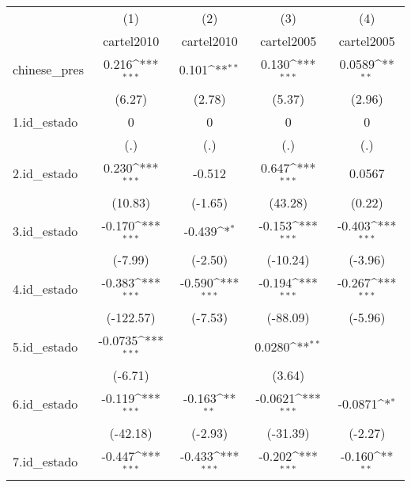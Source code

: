 {
\def\sym#1{\ifmmode^{#1}\else\(^{#1}\)\fi}
\begin{tabular}{l*{4}{c}}
\hline\hline
            &\multicolumn{1}{c}{(1)}&\multicolumn{1}{c}{(2)}&\multicolumn{1}{c}{(3)}&\multicolumn{1}{c}{(4)}\\
            &\multicolumn{1}{c}{cartel2010}&\multicolumn{1}{c}{cartel2010}&\multicolumn{1}{c}{cartel2005}&\multicolumn{1}{c}{cartel2005}\\
\hline
chinese\_pres&       0.216\sym{***}&       0.101\sym{**} &       0.130\sym{***}&      0.0589\sym{**} \\
            &      (6.27)         &      (2.78)         &      (5.37)         &      (2.96)         \\
[1em]
1.id\_estado &           0         &           0         &           0         &           0         \\
            &         (.)         &         (.)         &         (.)         &         (.)         \\
[1em]
2.id\_estado &       0.230\sym{***}&      -0.512         &       0.647\sym{***}&      0.0567         \\
            &     (10.83)         &     (-1.65)         &     (43.28)         &      (0.22)         \\
[1em]
3.id\_estado &      -0.170\sym{***}&      -0.439\sym{*}  &      -0.153\sym{***}&      -0.403\sym{***}\\
            &     (-7.99)         &     (-2.50)         &    (-10.24)         &     (-3.96)         \\
[1em]
4.id\_estado &      -0.383\sym{***}&      -0.590\sym{***}&      -0.194\sym{***}&      -0.267\sym{***}\\
            &   (-122.57)         &     (-7.53)         &    (-88.09)         &     (-5.96)         \\
[1em]
5.id\_estado &     -0.0735\sym{***}&                     &      0.0280\sym{**} &                     \\
            &     (-6.71)         &                     &      (3.64)         &                     \\
[1em]
6.id\_estado &      -0.119\sym{***}&      -0.163\sym{**} &     -0.0621\sym{***}&     -0.0871\sym{*}  \\
            &    (-42.18)         &     (-2.93)         &    (-31.39)         &     (-2.27)         \\
[1em]
7.id\_estado &      -0.447\sym{***}&      -0.433\sym{***}&      -0.202\sym{***}&      -0.160\sym{**} \\

\end{tabular}}

